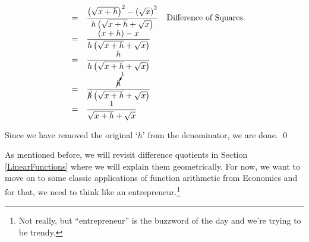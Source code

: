 \documentclass{ximera}
\begin{document}
\begin{example}
\begin{enumerate}
\[\begin{array}{rcll}
												 & = &  \dfrac{\left(\sqrt{x+h}\right)^2 - \left(\sqrt{x}\right)^2}{h\left(\sqrt{x+h} + \sqrt{x}\right)} & \text{Difference of Squares.}\\  
												
												& = &  \dfrac{(x+h) - x}{h\left(\sqrt{x+h} + \sqrt{x}\right)} & \\  
												
												 & = &  \dfrac{h}{h\left(\sqrt{x+h} + \sqrt{x}\right)} & \\  
												 
												 												 & = &  \dfrac{\cancelto{1}{h}}{\cancel{h}\left(\sqrt{x+h} + \sqrt{x}\right)} & \\  
										
										
												 & = &  \dfrac{1}{\sqrt{x+h} + \sqrt{x}} & \\ 
												\end{array}\]	


Since we have removed the original `$h$' from the denominator, we are done.  \qed

\end{enumerate}

\end{example}

\label{diffquotgeompromise}

As mentioned before, we will revisit difference quotients in Section \ref{LinearFunctions} where we will explain them geometrically.  For now, we want to move on to some classic applications of function arithmetic from Economics and for that, we need to think like an entrepreneur.\footnote{Not really, but ``entrepreneur'' is the buzzword of the day and we're trying to be trendy.}

\medskip
\end{document}

